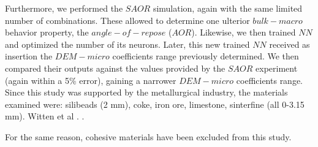 Furthermore, we performed the $SAOR$ simulation, again with the same limited number of combinations.
These allowed to determine one ulterior $bulk-macro$ behavior property, the
$angle-of-repose$ ($AOR$).
Likewise, we then trained $NN$ and optimized the number of its neurons.
Later, this new trained $NN$ received as insertion the $DEM-micro$ coefficients
range previously determined.
We then compared their outputs against the values provided by the $SAOR$ experiment (again within a 5\% error), gaining a narrower $DEM-micro$ coefficients range.
Since this study was supported by the metallurgical industry, the materials
examined were: silibeads (2 mm), coke, iron ore, limestone, sinterfine (all
0-3.15 mm).
Witten et al . \cite{RefWorks:174}.

For the same reason, cohesive materials have been excluded from this study.\\ \label{par:materials}